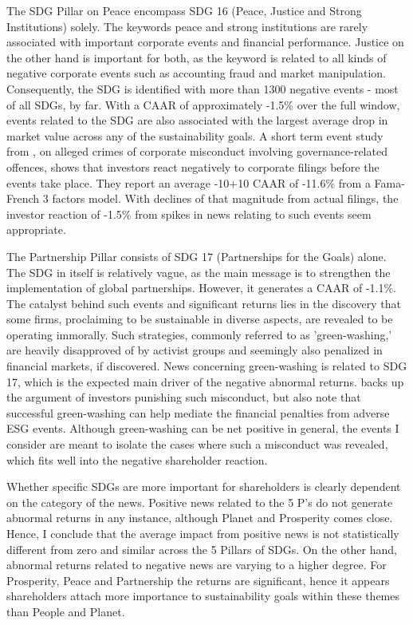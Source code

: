The SDG Pillar on Peace encompass SDG 16 (Peace, Justice and Strong Institutions) solely. The keywords peace and strong institutions are rarely associated with important corporate events and financial performance. Justice on the other hand is important for both, as the keyword is related to all kinds of negative corporate events such as accounting fraud and market manipulation. Consequently, the SDG is identified with more than 1300 negative events - most of all SDGs, by far. With a CAAR of approximately -1.5\% over the full window, events related to the SDG are also associated with the largest average drop in market value across any of the sustainability goals. A short term event study from \cite{bauer2010misdeeds}, on alleged crimes of corporate misconduct involving governance-related offences, shows that investors react negatively to corporate filings before the events take place. They report an average -10\/+10 CAAR of -11.6\% from a Fama-French 3 factors model. With declines of that magnitude from actual filings, the investor reaction of -1.5\% from spikes in news relating to such events seem appropriate. 

The Partnership Pillar consists of SDG 17 (Partnerships for the Goals) alone. The SDG in itself is relatively vague, as the main message is to strengthen the implementation of global partnerships. However, it generates a CAAR of -1.1\%. The catalyst behind such events and significant returns lies in the discovery that some firms, proclaiming to be sustainable in diverse aspects, are revealed to be operating immorally. Such strategies, commonly referred to as 'green-washing,' are heavily disapproved of by activist groups and seemingly also penalized in financial markets, if discovered. News concerning green-washing is related to SDG 17, which is the expected main driver of the negative abnormal returns. \cite{Blancard_ESG_sentiment} backs up the argument of investors punishing such misconduct, but also note that successful green-washing can help mediate the financial penalties from adverse ESG events. Although green-washing can be net positive in general, the events I consider are meant to isolate the cases where such a misconduct was revealed, which fits well into the negative shareholder reaction.   

Whether specific SDGs are more important for shareholders is clearly dependent on the category of the news. Positive news related to the 5 P's do not generate abnormal returns in any instance, although Planet and Prosperity comes close. Hence, I conclude that the average impact from positive news is not statistically different from zero and similar across the 5 Pillars of SDGs. On the other hand, abnormal returns related to negative news are varying to a higher degree. For Prosperity, Peace and Partnership the returns are significant, hence it appears shareholders attach more importance to sustainability goals within these themes than People and Planet.    



